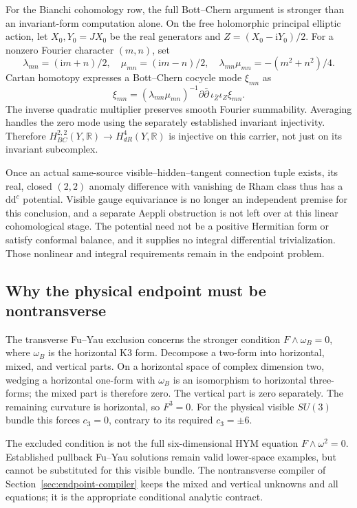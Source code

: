 \documentclass[11pt]{article}
\theoremstyle{definition}
\theoremstyle{remark}
\newcommand{\dd}{\mathrm d}
\newcommand{\ii}{\mathrm i}
\begin{document}
For the Bianchi cohomology row, the full Bott--Chern argument \cite{FRG3X}
is stronger than an invariant-form computation alone.  On the free
holomorphic principal elliptic action, let \(X_0,Y_0=JX_0\) be the real
generators and \(Z=(X_0-\ii Y_0)/2\).  For a nonzero Fourier character
\((m,n)\), set
\[
\lambda_{mn}=(\ii m+n)/2,\quad
\mu_{mn}=(\ii m-n)/2,\quad
\lambda_{mn}\mu_{mn}=-(m^2+n^2)/4.
\]
Cartan homotopy expresses a Bott--Chern cocycle mode \(\xi_{mn}\) as
\[
\xi_{mn}=(\lambda_{mn}\mu_{mn})^{-1}
\partial\bar\partial\,\iota_{\bar Z}\iota_Z\xi_{mn}.
\]
The inverse quadratic multiplier preserves smooth Fourier summability.
Averaging handles the zero mode using the separately established invariant
injectivity.  Therefore
\(H^{2,2}_{BC}(Y,\mathbb R)\to H^4_{dR}(Y,\mathbb R)\) is injective
on this carrier, not just on its invariant subcomplex.

Once an actual same-source visible--hidden--tangent connection tuple exists,
its real, closed \((2,2)\) anomaly difference with vanishing de Rham class
thus has a \(\dd\dd^c\) potential.  Visible gauge equivariance is no longer
an independent premise for this conclusion, and a separate Aeppli
obstruction is not left over at this linear cohomological stage.  The
potential need not be a positive Hermitian form or satisfy conformal
balance, and it supplies no integral differential trivialization.  Those
nonlinear and integral requirements remain in the endpoint problem.

\subsection{Why the physical endpoint must be nontransverse}
\label{sec:transverse-nogo}

The transverse Fu--Yau exclusion \cite{FRG3Y} concerns the stronger
condition \(F\wedge\omega_B=0\), where \(\omega_B\) is the horizontal
K3 form.  Decompose a two-form into horizontal, mixed, and vertical parts.
On a horizontal space of complex dimension two, wedging a horizontal
one-form with \(\omega_B\) is an isomorphism to horizontal three-forms;
the mixed part is therefore zero.  The vertical part is zero separately.
The remaining curvature is horizontal, so \(F^3=0\).  For the physical
visible \(SU(3)\) bundle this forces \(c_3=0\), contrary to its required
\(c_3=\pm6\).

The excluded condition is not the full six-dimensional HYM equation
\(F\wedge\omega^2=0\).  Established pullback Fu--Yau solutions remain
valid lower-space examples, but cannot be substituted for this visible
bundle.  The nontransverse compiler of
Section~\ref{sec:endpoint-compiler} keeps the mixed and vertical unknowns
and all equations; it is the appropriate conditional analytic contract.
\end{document}
